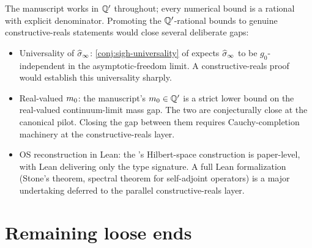 %

The manuscript works in $\mathbb{Q}'$ throughout; every numerical bound
is a rational with explicit denominator.  Promoting the
$\mathbb{Q}'$-rational bounds to genuine constructive-reals statements
would close several deliberate gaps:

\begin{itemize}
  \item Universality of $\widehat{\sigma}_\infty$: \cref{conj:sigh-universality}
    of  expects $\widehat{\sigma}_\infty$ to be
    $g_0$-independent in the asymptotic-freedom limit.  A
    constructive-reals proof would establish this universality
    sharply.
  \item Real-valued $m_0$: the manuscript's
    $m_0 \in \mathbb{Q}'$ is a strict lower bound on the real-valued
    continuum-limit mass gap.  The two are conjecturally close at
    the canonical pilot.  Closing the gap between them requires
    Cauchy-completion machinery at the
    constructive-reals layer.
  \item OS reconstruction in Lean: the
    's
    Hilbert-space construction is paper-level, with Lean
    delivering only the type signature.  A full Lean
    formalization (Stone's theorem, spectral theorem for
    self-adjoint operators) is a major undertaking deferred to
    the parallel constructive-reals layer.
\end{itemize}

\section{Remaining loose ends}
\label{sec:roadmap-loose-ends}

%

